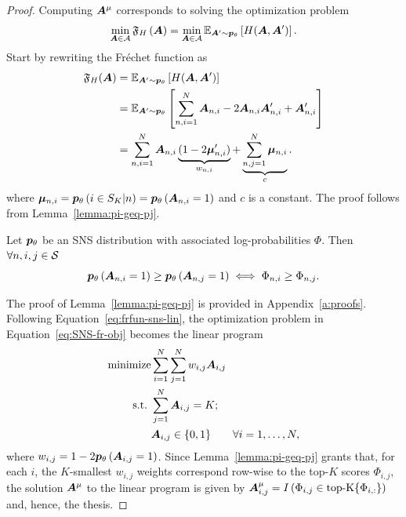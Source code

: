 \begin{proof}
Computing ${\bm{A}}^\mu$ corresponds to solving the optimization problem
\begin{align}\label{eq:SNS-fr-obj}
    \min_{{\bm{A}} \in {\mathcal{A}}} \mathfrak{F}_H\left({\bm{A}}\right) = \min_{{\bm{A}} \in {\mathcal{A}}} \mathbb{E}_{{\bm{A}}^\prime \sim {{\bm{p}}_\theta}} \left[H({\bm{A}}, {\bm{A}}^\prime)\right].
\end{align}
Start by rewriting the Fr\'echet function as
\begin{align}
     \mathfrak{F}_H({\bm{A}}) &= \mathbb{E}_{{\bm{A}}^\prime \sim {{\bm{p}}_\theta}} \left[H({\bm{A}}, {\bm{A}}^\prime)\right]\\ 
     &= \mathbb{E}_{{\bm{A}}^\prime \sim {{\bm{p}}_\theta}} \left[\sum_{n,i=1}^N{\bm{A}}_{n,i} - 2{\bm{A}}_{n,i}{\bm{A}}_{n,i}^{\prime}  + {\bm{A}}_{n,i}^{\prime}\right]\\ 
     &= \sum_{n,i=1}^N{\bm{A}}_{n,i} \underbrace{(1 - 2\boldsymbol{\mu}_{n,i}')}_{w_{n,i}}  + \underbrace{\sum_{n,j=1}^N \boldsymbol{\mu}_{n,i}}_{c}.\label{eq:frfun-sns-lin}
\end{align}
where $\boldsymbol{\mu}_{n,i}={{\bm{p}}_\theta}\left(i \in S_K | n\right) = {{\bm{p}}_\theta}\left({\bm{A}}_{n,i}=1\right)$ and $c$ is a constant. The proof follows from Lemma~\ref{lemma:pi-geq-pj}.
\begin{lemma}\label{lemma:pi-geq-pj}
    Let ${{\bm{p}}_\theta}$ be an SNS distribution with associated log-probabilities $\Phi$.
    Then $\forall n,i,j\in \mathcal{S}$
    \begin{equation}
        {{\bm{p}}_\theta}\left({\bm{A}}_{n,i}=1\right) \geq {{\bm{p}}_\theta}\left({\bm{A}}_{n,j}=1\right) \iff \Phi_{n,i} \geq \Phi_{n,j}.
    \end{equation}
\end{lemma}
%
The proof of Lemma~\ref{lemma:pi-geq-pj} is provided in Appendix~\ref{a:proofs}. Following Equation~\eqref{eq:frfun-sns-lin}, the optimization problem in Equation~\eqref{eq:SNS-fr-obj} becomes the linear program
\begin{equation}\label{eq:sns-linear-program}
    \begin{aligned}
    \text{minimize} &\sum_{i=1}^N \sum_{j=1}^N w_{i,j} {\bm{A}}_{i,j}\\
    \text{s.t.\ } &\sum_{j=1}^N {\bm{A}}_{i,j} = K;\\
    & {\bm{A}}_{i,j} \in \{0,1\} \qquad \forall i=1,\dots,N,\\
    \end{aligned}
\end{equation}
where $w_{i,j} = 1 - 2{{\bm{p}}_\theta}\left({\bm{A}}_{i,j}=1\right)$.
Since Lemma~\ref{lemma:pi-geq-pj} grants that, for each $i$, the $K$-smallest $w_{i,j}$ weights correspond row-wise to the top-$K$ scores $\Phi_{i,j}$, the solution ${\bm{A}}^\mu$ to the linear program is given by ${\bm{A}}^\mu_{i,j} = I\left(\Phi_{i,j} \in \small{\operatorname*{top-K}} \{\Phi_{i,:}\}\right)$ and, hence, the thesis.
\end{proof}


